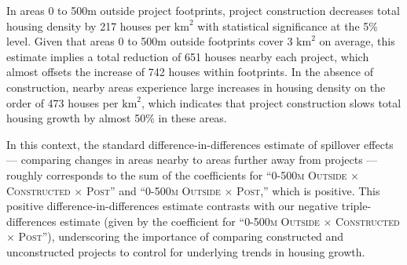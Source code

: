 \documentclass[12pt]{article}
\begin{document}
\begin{table}
\small
\centering
\caption{Infrastructure BBLU}\label{table:inf_census}
\vspace{-2mm}
\end{table}




In areas 0 to 500m outside project footprints, project construction decreases total housing density by 217 houses per $\text{km}^{2}$ with statistical significance at the 5\% level.  Given that areas 0 to 500m outside footprints cover 3 $\text{km}^{2}$ on average, this estimate implies a total reduction of 651 houses nearby each project, which almost offsets the increase of 742 houses within footprints.  In the absence of construction, nearby areas experience large increases in housing density on the order of 473 houses per $\text{km}^{2}$, which indicates that project construction slows total housing growth by almost 50\% in these areas.  


In this context, the standard difference-in-differences estimate of spillover effects --- comparing changes in areas nearby to areas further away from projects --- roughly corresponds to the sum of the coefficients for ``\textsc{0-500m Outside} $\times$ \textsc{Constructed} $\times$ \textsc{Post}'' and ``\textsc{0-500m Outside} $\times$ \textsc{Post},'' which is positive.  This positive difference-in-differences estimate contrasts with our negative triple-differences estimate (given by the coefficient for ``\textsc{0-500m Outside} $\times$ \textsc{Constructed} $\times$ \textsc{Post}''), underscoring the importance of comparing constructed and unconstructed projects to control for underlying trends in housing growth.
\end{document}
